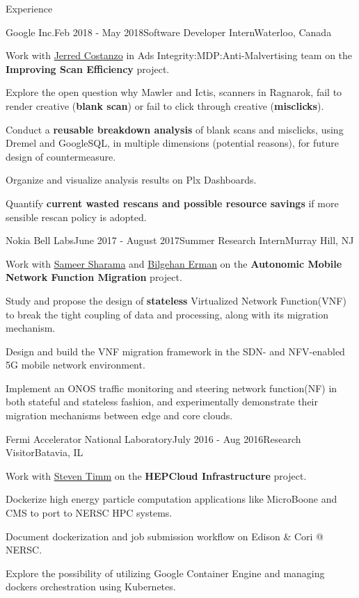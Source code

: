 \documentclass{resume} %
\begin{document}
\begin{rSection}{Experience}

\begin{rSubsection}{Google Inc.}{Feb 2018 - May 2018}{Software Developer Intern}{Waterloo, Canada}
\item Work with \href{https://moma.corp.google.com/person/jerred}{Jerred Costanzo} in Ads Integrity:MDP:Anti-Malvertising team on the \textbf{Improving
    Scan Efficiency} project.
\item Explore the open question why Mawler and Ictis, scanners in Ragnarok,
    fail to render creative (\textbf{blank scan}) or fail to click through creative (\textbf{misclicks}).
\item Conduct a \textbf{reusable breakdown analysis} of blank scans and misclicks, using Dremel and GoogleSQL,
    in multiple dimensions (potential reasons), for future design of countermeasure.
\item Organize and visualize analysis results on Plx Dashboards.
\item Quantify \textbf{current wasted rescans and possible resource savings} if more sensible rescan
    policy is adopted.
\end{rSubsection}

\begin{rSubsection}{Nokia Bell Labs}{June 2017 - August 2017}{Summer Research Intern}{Murray Hill, NJ}
\item Work with \href{https://www.bell-labs.com/usr/sameer.sharma}{Sameer Sharama} and \href{https://www.bell-labs.com/usr/bilgehan.erman}{Bilgehan Erman} on the \textbf{Autonomic Mobile Network Function Migration} project.
\item Study and propose the design of \textbf{stateless} Virtualized Network Function(VNF) to break the tight coupling of data and processing, along with its migration mechanism.
\item Design and build the VNF migration framework in the SDN- and NFV-enabled 5G mobile network environment.
\item Implement an ONOS traffic monitoring and steering network function(NF) in both stateful and stateless fashion, and experimentally demonstrate their migration mechanisms between edge and core clouds.
\end{rSubsection}


\begin{rSubsection}{Fermi Accelerator National Laboratory}{July 2016 - Aug 2016}{Research Visitor}{Batavia, IL}
\item Work with \href{http://home.fnal.gov/~timm/}{Steven Timm} on the \textbf{HEPCloud Infrastructure} project.
\item Dockerize high energy particle computation applications like MicroBoone and CMS to port to NERSC HPC systems.
\item Document dockerization and job submission workflow on Edison \& Cori @ NERSC.
\item Explore the possibility of utilizing Google Container Engine and managing dockers orchestration using Kubernetes.
\end{rSubsection}


\end{rSection}
\end{document}
